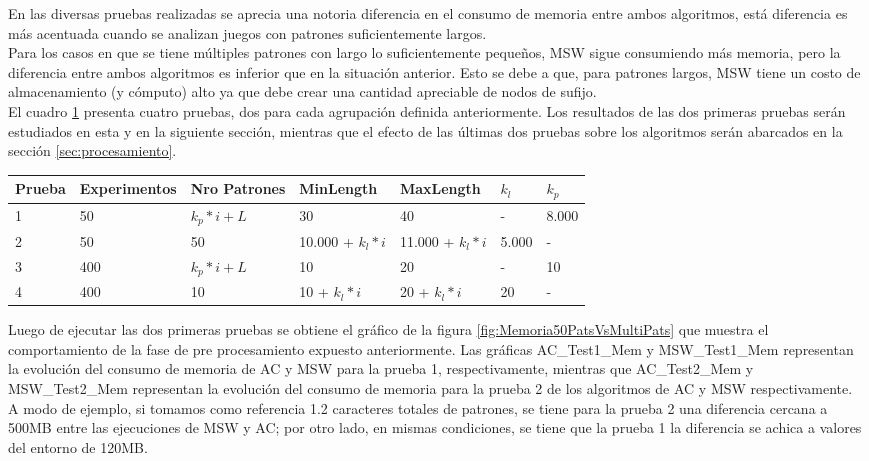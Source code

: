 {En las diversas pruebas realizadas se aprecia una notoria diferencia en el consumo de memoria entre ambos algoritmos, está diferencia es más acentuada cuando se analizan juegos con patrones suficientemente largos. \\
Para los casos en que se tiene múltiples patrones con largo lo suficientemente pequeños, MSW sigue consumiendo más memoria, pero la diferencia entre ambos algoritmos es inferior que en la situación anterior. Esto se debe a que, para patrones largos, MSW tiene un costo de almacenamiento (y cómputo) alto ya que debe crear una cantidad apreciable de nodos de sufijo. \\
El cuadro \ref{tab:Definicion_Pruebas} presenta cuatro pruebas, dos para cada agrupación definida anteriormente. Los resultados de las dos primeras pruebas serán estudiados en esta y en la siguiente sección, mientras que el efecto de las últimas dos pruebas sobre los algoritmos serán abarcados en la sección \ref{sec:procesamiento}.
\begin{table}[H]
\begin{center}
\begin{tabular}{ | l | l | l | l | l | l | l |}
\hline
    Prueba & Experimentos & Nro Patrones & MinLength & MaxLength & $k_{l}$ & $k_{p}$ \\ \hline
    1 & 50 & $k_{p} * i + L$ & 30 & 40 & - & 8.000 \\ \hline
    2 & 50 & 50 & 10.000 + $k_{l} * i$ & 11.000 + $k_{l} * i$ & 5.000 & - \\ \hline
    3 & 400 & $k_{p} * i + L$ & 10 & 20 & - & 10 \\ \hline
    4 & 400 & 10 & 10 + $k_{l} * i$ & 20 + $k_{l} * i$ & 20 & - \\ \hline
\end{tabular}
 \label{tab:Definicion_Pruebas} 
\end{center}
\end{table}
Luego de ejecutar las dos primeras pruebas se obtiene el gráfico de la figura \ref{fig:Memoria50PatsVsMultiPats} que muestra el comportamiento de la fase de pre procesamiento expuesto anteriormente. Las gráficas AC\_Test1\_Mem y MSW\_Test1\_Mem representan la evolución del consumo de memoria de AC y MSW para la prueba 1, respectivamente, mientras que  AC\_Test2\_Mem y MSW\_Test2\_Mem representan la evolución del consumo de memoria para la prueba 2 de los algoritmos de AC y MSW respectivamente. \\
A modo de ejemplo, si tomamos como referencia 1.2 caracteres totales de patrones, se tiene para la prueba 2 una diferencia cercana a 500MB entre las ejecuciones de MSW y AC; por otro lado, en mismas condiciones, se tiene que la prueba 1 la diferencia se achica a valores del entorno de 120MB.\\
}
